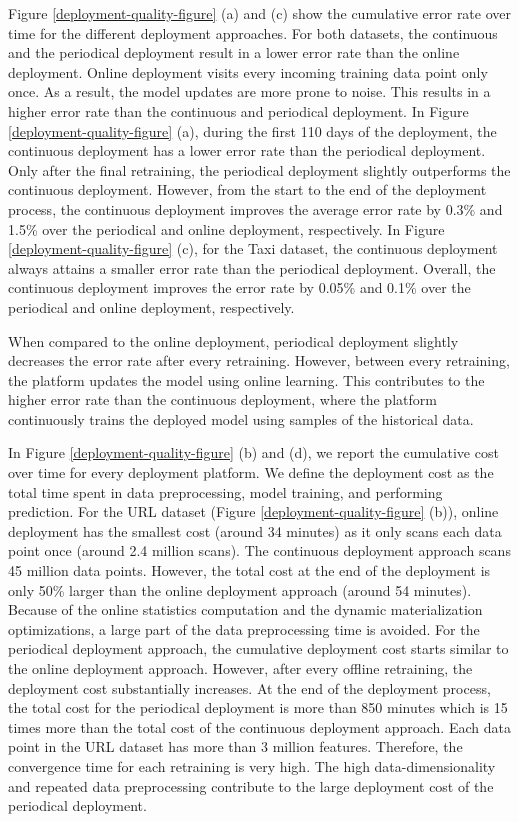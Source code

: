 Figure \ref{deployment-quality-figure} (a) and (c) show the cumulative error rate over time for the different deployment approaches.
For both datasets, the continuous and the periodical deployment result in a lower error rate than the online deployment.
Online deployment visits every incoming training data point only once.
As a result, the model updates are more prone to noise.
This results in a higher error rate than the continuous and periodical deployment.
In Figure \ref{deployment-quality-figure} (a), during the first 110 days of the deployment, the continuous deployment has a lower error rate than the periodical deployment.
Only after the final retraining, the periodical deployment slightly outperforms the continuous deployment.
However, from the start to the end of the deployment process, the continuous deployment improves the average error rate by 0.3\% and 1.5\% over the periodical and online deployment, respectively.
In Figure \ref{deployment-quality-figure}  (c), for the Taxi dataset, the continuous deployment always attains a smaller error rate than the periodical deployment.
Overall, the continuous deployment improves the error rate by 0.05\% and  0.1\% over the periodical and online deployment, respectively.

When compared to the online deployment, periodical deployment slightly decreases the error rate after every retraining.
However, between every retraining, the platform updates the model using online learning.
This contributes to the higher error rate than the continuous deployment, where the platform continuously trains the deployed model using samples of the historical data.

In Figure \ref{deployment-quality-figure} (b) and (d), we report the cumulative cost over time for every deployment platform.
We define the deployment cost as the total time spent in data preprocessing, model training, and performing prediction.
For the URL dataset (Figure \ref{deployment-quality-figure} (b)), online deployment has the smallest cost (around 34 minutes) as it only scans each data point once (around 2.4 million scans).  
The continuous deployment approach scans 45 million data points.
However, the total cost at the end of the deployment is only 50\% larger than the online deployment approach (around 54 minutes).  
Because of the online statistics computation and the dynamic materialization optimizations, a large part of the data preprocessing time is avoided.
For the periodical deployment approach, the cumulative deployment cost starts similar to the online deployment approach.
However, after every offline retraining, the deployment cost substantially increases.
At the end of the deployment process, the total cost for the periodical deployment is more than 850 minutes which is 15 times more than the total cost of the continuous deployment approach.
Each data point in the URL dataset has more than 3 million features.
Therefore, the convergence time for each retraining is very high.
The high data-dimensionality and repeated data preprocessing contribute to the large deployment cost of the periodical deployment.

